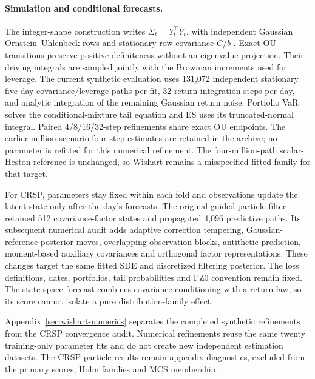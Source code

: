 \documentclass[11pt]{article}
\theoremstyle{definition}\newtheorem{definition}[theorem]{Definition}
\theoremstyle{remark}\newtheorem{remark}[theorem]{Remark}
\begin{document}
\paragraph{Simulation and conditional forecasts.}
The integer-shape construction writes $\Sigma_t=Y_t^\top Y_t$, with independent Gaussian Ornstein--Uhlenbeck rows and stationary row covariance $C/b$ \citep{gauthier2009wishart}. Exact OU transitions preserve positive definiteness without an eigenvalue projection. Their driving integrals are sampled jointly with the Brownian increments used for leverage. The current synthetic evaluation uses 131,072 independent stationary five-day covariance/leverage paths per fit, 32 return-integration steps per day, and analytic integration of the remaining Gaussian return noise. Portfolio VaR solves the conditional-mixture tail equation and ES uses its truncated-normal integral. Paired 4/8/16/32-step refinements share exact OU endpoints. The earlier million-scenario four-step estimates are retained in the archive; no parameter is refitted for this numerical refinement. The four-million-path scalar-Heston reference is unchanged, so Wishart remains a misspecified fitted family for that target.

For CRSP, parameters stay fixed within each fold and observations update the latent state only after the day's forecasts. The original guided particle filter retained 512 covariance-factor states and propagated 4,096 predictive paths. Its subsequent numerical audit adds adaptive correction tempering, Gaussian-reference posterior moves, overlapping observation blocks, antithetic prediction, moment-based auxiliary covariances and orthogonal factor representations. These changes target the same fitted SDE and discretized filtering posterior. The loss definitions, dates, portfolios, tail probabilities and FZ0 convention remain fixed. The state-space forecast combines covariance conditioning with a return law, so its score cannot isolate a pure distribution-family effect.

Appendix~\ref{sec:wishart-numerics} separates the completed synthetic refinements from the CRSP convergence audit. Numerical refinements reuse the same twenty training-only parameter fits and do not create new independent estimation datasets. The CRSP particle results remain appendix diagnostics, excluded from the primary scores, Holm families and MCS membership.
\end{document}
